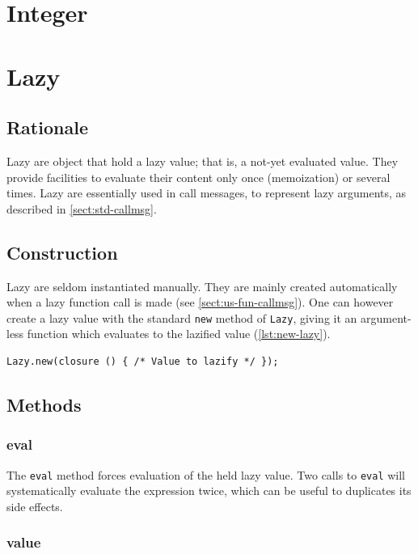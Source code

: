 \documentclass[openright,twoside,12pt]{report}
\newcommand   {\floatpos}          {htbp}
\newcommand{\lst}[1]{\autoref{lst:#1}}
\newcommand{\sect}[1]{\autoref{sect:#1}}
\begin{document}
\section{Integer}
\section{Lazy}

\subsection{Rationale}

Lazy are object that hold a lazy value; that is, a not-yet evaluated
value. They provide facilities to evaluate their content only once
(memoization) or several times. Lazy are essentially used in call
messages, to represent lazy arguments, as described in
\sect{std-callmsg}.

\subsection{Construction}

Lazy are seldom instantiated manually. They are mainly created
automatically when a lazy function call is made (see
\sect{us-fun-callmsg}). One can however create a lazy value with the
standard \lstinline|new| method of \lstinline|Lazy|, giving it an
argument-less function which evaluates to the lazified value
(\lst{new-lazy}).

\begin{lstlisting}[caption=Creating a lazy value, label=lst:new-lazy,
  float=\floatpos]
  Lazy.new(closure () { /* Value to lazify */ });
\end{lstlisting}

\subsection{Methods}
\subsubsection{eval}

The \lstinline|eval| method forces evaluation of the held lazy
value. Two calls to \lstinline|eval| will systematically evaluate the
expression twice, which can be useful to duplicates its side effects.

\subsubsection{value}
\end{document}
